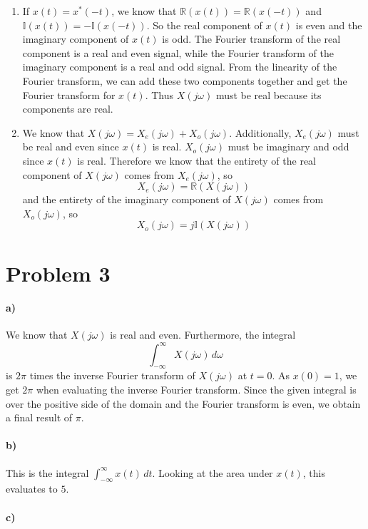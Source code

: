 \documentclass[12pt]{article}
\begin{document}
\begin{enumerate}
    \item If \(x(t)=x^*(-t)\), we know that \(\mathbb{R}(x(t))=\mathbb{R}(x(-t))\) and \(\mathbb{I}(x(t))=-\mathbb{I}(x(-t))\). So the real component of \(x(t)\) is even and the imaginary component of \(x(t)\)
    is odd. The Fourier transform of the real component is a real and even signal, while the Fourier transform of the imaginary component is a real and odd signal. From the linearity of the Fourier transform, we can
    add these two components together and get the Fourier transform for \(x(t)\). Thus \(X(j\omega)\) must be real because its components are real.
    \item We know that \(X(j\omega)=X_e(j\omega)+X_o(j\omega)\). Additionally, \(X_e(j\omega)\) must be real and even since \(x(t)\) is real. \(X_o(j\omega)\) must be imaginary and odd since \(x(t)\) is real.
    Therefore we know that the entirety of the real component of \(X(j\omega)\) comes from \(X_e(j\omega)\), so
    \[X_e(j\omega)=\mathbb{R}(X(j\omega))\]
    and the entirety of the imaginary component of \(X(j\omega)\) comes from \(X_o(j\omega)\), so
    \[X_o(j\omega)=j\mathbb{I}(X(j\omega))\]
\end{enumerate}

\section*{Problem 3}

\paragraph{a)}

We know that \(X(j\omega)\) is real and even. Furthermore, the integral
\[\int_{-\infty}^\infty X(j\omega)\, d\omega\]
is \(2\pi\) times the inverse Fourier transform of \(X(j\omega)\) at \(t=0\). As \(x(0)=1\), we get \(2\pi\) when evaluating
the inverse Fourier transform. Since the given integral is over the positive side of the domain and the Fourier transform is even,
we obtain a final result of \(\pi\).

\paragraph{b)}

This is the integral \(\int_{-\infty}^\infty x(t)\,dt\). Looking at the area under \(x(t)\), this evaluates to \(5\).

\paragraph{c)}
\end{document}
